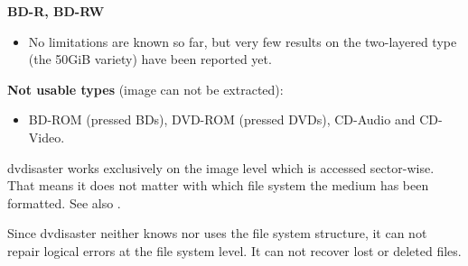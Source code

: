 {\medskip

{\bf BD-R, BD-RW}

\begin{itemize}
\item No limitations are known so far, but very few results on the
  two-layered type (the 50GiB variety) have been reported yet.
\end{itemize}

\medskip

{\bf Not usable types} (image can not be extracted):

\begin{itemize}
\item BD-ROM (pressed BDs), DVD-ROM (pressed DVDs), CD-Audio and CD-Video.
\end{itemize}}

   {dvdisaster works exclusively on the image level which is accessed
     sector-wise. That means it does not matter with which file system
     the medium has been formatted. See also .

     \smallskip
     
     Since dvdisaster neither knows nor uses the file system structure,
     it can not repair logical errors at the file system level. It can not
     recover lost or deleted files. }

